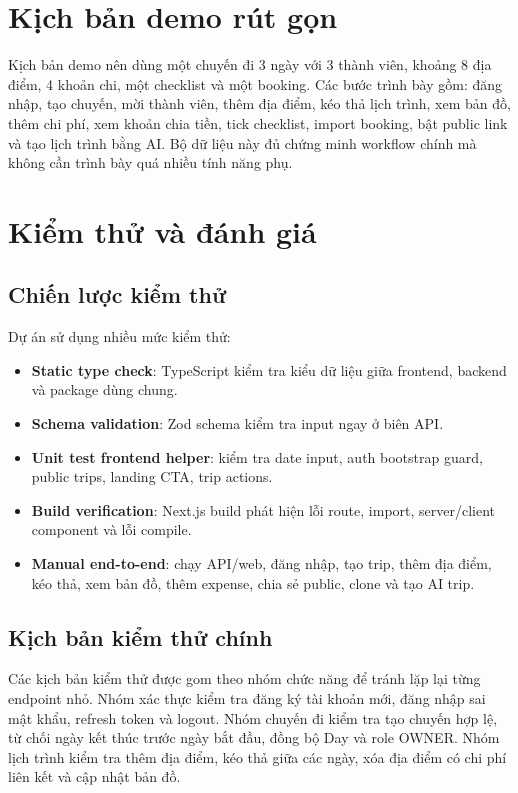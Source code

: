 \documentclass[a4paper]{report}
\begin{document}
\section{Kịch bản demo rút gọn}

Kịch bản demo nên dùng một chuyến đi 3 ngày với 3 thành viên, khoảng 8 địa điểm, 4 khoản chi, một checklist và một booking. Các bước trình bày gồm: đăng nhập, tạo chuyến, mời thành viên, thêm địa điểm, kéo thả lịch trình, xem bản đồ, thêm chi phí, xem khoản chia tiền, tick checklist, import booking, bật public link và tạo lịch trình bằng AI. Bộ dữ liệu này đủ chứng minh workflow chính mà không cần trình bày quá nhiều tính năng phụ.

\section{Kiểm thử và đánh giá}

\subsection{Chiến lược kiểm thử}

Dự án sử dụng nhiều mức kiểm thử:

\begin{itemize}
  \item \textbf{Static type check}: TypeScript kiểm tra kiểu dữ liệu giữa frontend, backend và package dùng chung.
  \item \textbf{Schema validation}: Zod schema kiểm tra input ngay ở biên API.
  \item \textbf{Unit test frontend helper}: kiểm tra date input, auth bootstrap guard, public trips, landing CTA, trip actions.
  \item \textbf{Build verification}: Next.js build phát hiện lỗi route, import, server/client component và lỗi compile.
  \item \textbf{Manual end-to-end}: chạy API/web, đăng nhập, tạo trip, thêm địa điểm, kéo thả, xem bản đồ, thêm expense, chia sẻ public, clone và tạo AI trip.
\end{itemize}

\subsection{Kịch bản kiểm thử chính}

Các kịch bản kiểm thử được gom theo nhóm chức năng để tránh lặp lại từng endpoint nhỏ. Nhóm xác thực kiểm tra đăng ký tài khoản mới, đăng nhập sai mật khẩu, refresh token và logout. Nhóm chuyến đi kiểm tra tạo chuyến hợp lệ, từ chối ngày kết thúc trước ngày bắt đầu, đồng bộ Day và role OWNER. Nhóm lịch trình kiểm tra thêm địa điểm, kéo thả giữa các ngày, xóa địa điểm có chi phí liên kết và cập nhật bản đồ.
\end{document}
